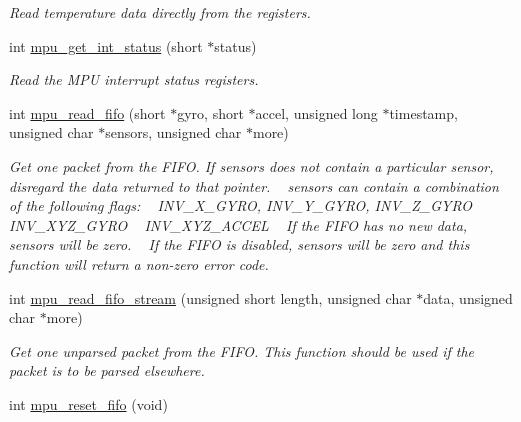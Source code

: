 \begin{DoxyCompactItemize}
\begin{DoxyCompactList}\small\item\em Read temperature data directly from the registers. \end{DoxyCompactList}\item 
int \hyperlink{group___d_r_i_v_e_r_s_ga0afd02d8c76d3278b488ef7038c26e3e}{mpu\+\_\+get\+\_\+int\+\_\+status} (short $\ast$status)
\begin{DoxyCompactList}\small\item\em Read the M\+PU interrupt status registers. \end{DoxyCompactList}\item 
int \hyperlink{group___d_r_i_v_e_r_s_ga2da20453aafbbba4a0f6fb9fbdd25572}{mpu\+\_\+read\+\_\+fifo} (short $\ast$gyro, short $\ast$accel, unsigned long $\ast$timestamp, unsigned char $\ast$sensors, unsigned char $\ast$more)
\begin{DoxyCompactList}\small\item\em Get one packet from the F\+I\+FO. If {\itshape sensors} does not contain a particular sensor, disregard the data returned to that pointer. ~\newline
 {\itshape sensors} can contain a combination of the following flags\+: ~\newline
 I\+N\+V\+\_\+\+X\+\_\+\+G\+Y\+RO, I\+N\+V\+\_\+\+Y\+\_\+\+G\+Y\+RO, I\+N\+V\+\_\+\+Z\+\_\+\+G\+Y\+RO ~\newline
 I\+N\+V\+\_\+\+X\+Y\+Z\+\_\+\+G\+Y\+RO ~\newline
 I\+N\+V\+\_\+\+X\+Y\+Z\+\_\+\+A\+C\+C\+EL ~\newline
 If the F\+I\+FO has no new data, {\itshape sensors} will be zero. ~\newline
 If the F\+I\+FO is disabled, {\itshape sensors} will be zero and this function will return a non-\/zero error code. \end{DoxyCompactList}\item 
int \hyperlink{group___d_r_i_v_e_r_s_ga13593044949b460e9f571eb57e9a0788}{mpu\+\_\+read\+\_\+fifo\+\_\+stream} (unsigned short length, unsigned char $\ast$data, unsigned char $\ast$more)
\begin{DoxyCompactList}\small\item\em Get one unparsed packet from the F\+I\+FO. This function should be used if the packet is to be parsed elsewhere. \end{DoxyCompactList}\item 
int \hyperlink{group___d_r_i_v_e_r_s_gaf23e9f57c0059be6ec57862f0584de10}{mpu\+\_\+reset\+\_\+fifo} (void)

\end{DoxyCompactItemize}
